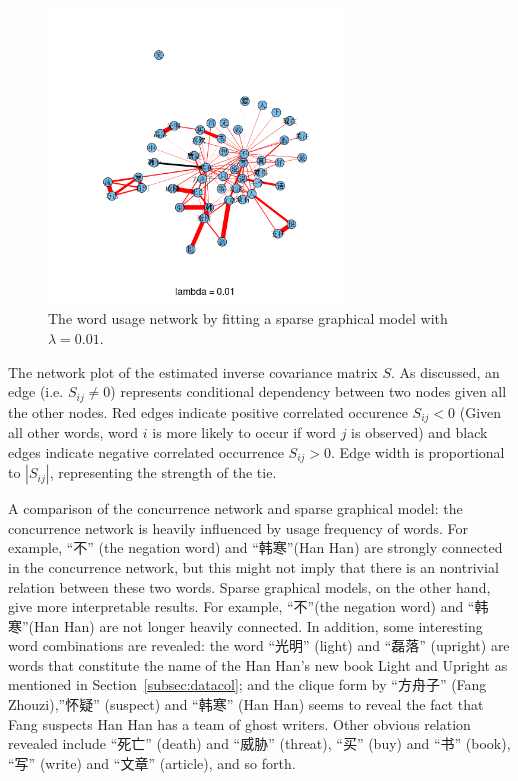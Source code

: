 \documentclass[11pt]{article}
\newcommand{\1}[1]{{\mathbf 1}\left\{#1\right\}}        %
\begin{document}
\begin{center}
\begin{figure}[tb]
   \centering
   \includegraphics[width=0.7\textwidth]{../gLassoResults/glasso1.png} 
      \caption{The word usage network by fitting a sparse graphical model with $\lambda = 0.01$.}
   \label{fig:glasso1}
\end{figure}
\end{center}


The network plot of the estimated inverse covariance matrix $S$. As discussed, an edge (i.e. $S_{ij}\neq 0$) represents conditional dependency between two nodes given all the other nodes. Red edges indicate positive correlated occurence $S_{ij}<0$ (Given all other words, word $i$ is more likely to occur if word $j$ is observed) and black edges indicate negative correlated occurrence $S_{ij}>0$. Edge width is proportional to $|S_{ij}|$, representing the strength of the tie.


A comparison of the concurrence network and sparse graphical model: the concurrence network is heavily influenced by usage frequency of words. For example, ``不'' (the negation word) and ``韩寒''(Han Han) are strongly connected in the concurrence network, but this might not imply that there is an nontrivial relation between these two words. Sparse graphical models, on the other hand, give more interpretable results. For example,  ``不''(the negation word) and ``韩寒''(Han Han) are not longer heavily connected. In addition, some interesting word combinations are revealed: the word ``光明'' (light) and ``磊落'' (upright) are words that constitute the name of the Han Han's new book {Light and Upright} as mentioned in Section~\ref{subsec:datacol}; and the clique form by ``方舟子'' (Fang Zhouzi),''怀疑'' (suspect) and  ``韩寒'' (Han Han) seems to reveal the fact that Fang suspects Han Han has a team of ghost writers. Other obvious relation revealed include ``死亡'' (death) and ``威胁'' (threat), ``买'' (buy) and ``书'' (book), ``写'' (write) and ``文章'' (article),  and so forth.
\end{document}
